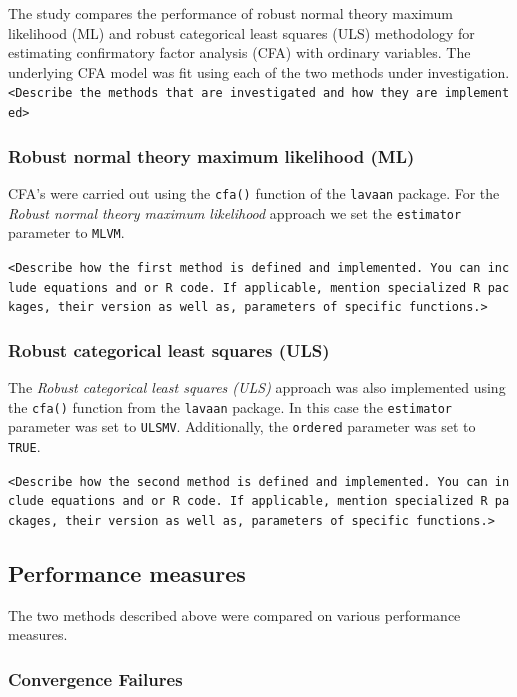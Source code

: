\documentclass[10,a4paperpaper,]{article}
\begin{document}
The study compares the performance of robust normal theory maximum
likelihood (ML) and robust categorical least squares (ULS) methodology
for estimating confirmatory factor analysis (CFA) with ordinary
variables. The underlying CFA model was fit using each of the two
methods under investigation.
\texttt{\textless{}Describe\ the\ methods\ that\ are\ investigated\ and\ how\ they\ are\ implemented\textgreater{}}

\subsubsection{Robust normal theory maximum likelihood (ML)}

CFA's were carried out using the \texttt{cfa()} function of the
\texttt{lavaan} package. For the \emph{Robust normal theory maximum
likelihood} approach we set the \texttt{estimator} parameter to
\texttt{MLVM}.

\texttt{\textless{}Describe\ how\ the\ first\ method\ is\ defined\ and\ implemented.\ You\ can\ include\ equations\ and\ or\ R\ code.\ If\ applicable,\ mention\ specialized\ R\ packages,\ their\ version\ as\ well\ as,\ parameters\ of\ specific\ functions.\textgreater{}}

\subsubsection{Robust categorical least squares (ULS)}

The \emph{Robust categorical least squares (ULS)} approach was also
implemented using the \texttt{cfa()} function from the \texttt{lavaan}
package. In this case the \texttt{estimator} parameter was set to
\texttt{ULSMV}. Additionally, the \texttt{ordered} parameter was set to
\texttt{TRUE}.

\texttt{\textless{}Describe\ how\ the\ second\ method\ is\ defined\ and\ implemented.\ You\ can\ include\ equations\ and\ or\ R\ code.\ If\ applicable,\ mention\ specialized\ R\ packages,\ their\ version\ as\ well\ as,\ parameters\ of\ specific\ functions.\textgreater{}}

\subsection{Performance measures}

The two methods described above were compared on various performance
measures.

\subsubsection{Convergence Failures}
\end{document}
